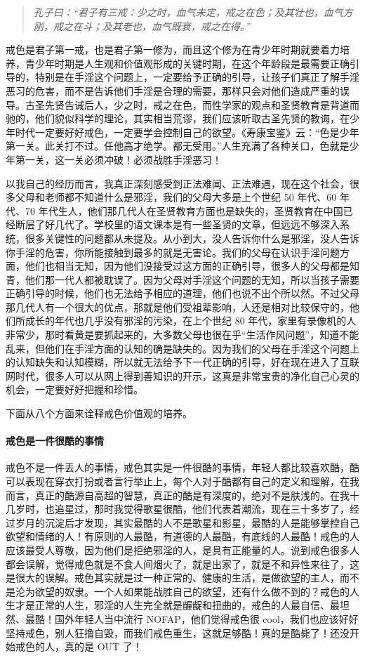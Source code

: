 \begin{quote}\it
    孔子曰：“君子有三戒：少之时，血气未定，戒之在色；及其壮也，血气方刚，戒之在斗；及其老也，血气既衰，戒之在得。”
\end{quote}

戒色是君子第一戒，也是君子第一修为，而且这个修为在青少年时期就要着力培养，青少年时期是人生观和价值观形成的关键时期，在这个年龄段是最需要正确引导的，特别是在手淫这个问题上，一定要给予正确的引导，让孩子们真正了解手淫恶习的危害，而不是告诉他们手淫是合理的需要，那样只会对他们造成严重的误导。古圣先贤告诫后人，少之时，戒之在色，而性学家的观点和圣贤教育是背道而驰的，他们貌似科学的理论，其实相当荒谬，我们应该听取古圣先贤的教诲，在少年时代一定要好好戒色，一定要学会控制自己的欲望。《寿康宝鉴》云：“色是少年第一关。此关打不过。任他高才绝学。都无受用。”人生充满了各种关口，色就是少年第一关，这一关必须冲破！必须战胜手淫恶习！

以我自己的经历而言，我真正深刻感受到正法难闻、正法难遇，现在这个社会，很多父母和老师都不知道什么是邪淫，我们的父母大多是上个世纪 50 年代、60 年代、70 年代生人，他们那几代人在圣贤教育方面也是缺失的，圣贤教育在中国已经断层了好几代了。学校里的语文课本是有一些圣贤的文章，但远远不够深入系统，很多关键性的问题都从未提及。从小到大，没人告诉你什么是邪淫，没人告诉你手淫的危害，你所能接触到最多的就是无害论。我们的父母在认识手淫问题方面，他们也相当无知，因为他们没接受过这方面的正确引导，很多人的父母都是知青，他们那一代人都被耽误了。因为父母对手淫这个问题的无知，所以当孩子需要正确引导的时候，他们也无法给予相应的道理，他们也说不出个所以然。不过父母那几代人有一个很大的优点，那就是他们受祖辈影响，人还是相对比较保守的，他们所成长的年代也几乎没有邪淫的污染，在上个世纪 80 年代，家里有录像机的人非常少，那时看黄是要抓起来的，大多数父母也很在乎“生活作风问题”，知道不能乱来，但他们在手淫方面的认知的确是缺失的。因为我们的父母在手淫这个问题上的认知缺失和认知模糊，所以就无法给予下一代正确的引导，好在现在进入了互联网时代，很多人可以从网上得到善知识的开示，这真是非常宝贵的净化自己心灵的机会，一定要好好把握和珍惜。

下面从八个方面来诠释戒色价值观的培养。

\paragraph{戒色是一件很酷的事情}

戒色不是一件丢人的事情，戒色其实是一件很酷的事情，年轻人都比较喜欢酷，酷可以表现在穿衣打扮或者言行举止上，每个人对于酷都有自己的定义和理解，在我而言，真正的酷源自高超的智慧，真正的酷是有深度的，绝对不是肤浅的。在我十几岁时，也追星过，那时我觉得歌星很酷，他们代表着潮流，现在三十多岁了，经过岁月的沉淀后才发现，其实最酷的人不是歌星和影星，最酷的人是能够掌控自己欲望和情绪的人！有原则的人最酷，有道德的人最酷，有底线的人最酷！戒色的人应该最受人尊敬，因为他们是拒绝邪淫的人，是具有正能量的人。说到戒色很多人都会误解，觉得戒色就是不食人间烟火了，就是出家了，就是不和异性来往了，这是很大的误解。戒色其实就是过一种正常的、健康的生活，是做欲望的主人，而不是沦为欲望的奴隶。一个人如果能战胜自己的欲望，还有什么做不到的？戒色的人生才是正常的人生，邪淫的人生完全就是龌龊和扭曲的，戒色的人最自信、最坦然、最酷！国外年轻人当中流行 NOFAP，他们觉得戒色很 cool，我们也应该好好坚持戒色，别人狂撸自毁，而我们戒色重生，这就足够酷！真的是酷毙了！还没开始戒色的人，真的是 OUT 了！


